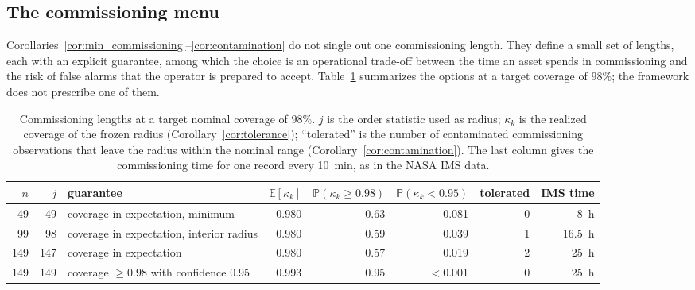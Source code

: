 \documentclass[a4paper]{cas-sc}
\newenvironment{reviewadded}{\par\color{blue}}{\par}
\newcommand{\Prob}{\ensuremath{\mathbb{P}}}
\newcommand{\Expect}{\ensuremath{\mathbb{E}}}
\begin{document}
\begin{reviewadded}
\subsection{The commissioning menu}
\label{subsec:commissioning_menu}

Corollaries~\ref{cor:min_commissioning}--\ref{cor:contamination} do not
single out one commissioning length. They define a small set of lengths, each
with an explicit guarantee, among which the choice is an operational
trade-off between the time an asset spends in commissioning and the risk of
false alarms that the operator is prepared to accept.
Table~\ref{tab:commissioning_menu} summarizes the options at a target coverage
of \(98\%\); the framework does not prescribe one of them.

\begin{table}[htbp]
\color{blue}
\centering
\caption{Commissioning lengths at a target nominal coverage of \(98\%\).
\(j\) is the order statistic used as radius; \(\kappa_k\) is the realized coverage of
the frozen radius (Corollary~\ref{cor:tolerance}); ``tolerated'' is the
number of contaminated commissioning observations that leave the radius
within the nominal range (Corollary~\ref{cor:contamination}). The last column
gives the commissioning time for one record every 10~min, as in the NASA IMS
data.}
\label{tab:commissioning_menu}
\setlength{\tabcolsep}{4pt}\small
\begin{tabular}{rrlrrrrr}
\toprule
\(n\) & \(j\) & guarantee & \(\Expect[\kappa_k]\) & \(\Prob(\kappa_k\ge0.98)\) &
\(\Prob(\kappa_k<0.95)\) & tolerated & IMS time \\
\midrule
49  & 49  & coverage in expectation, minimum        & 0.980 & 0.63 & 0.081   & 0 & 8~h    \\
99  & 98  & coverage in expectation, interior radius & 0.980 & 0.59 & 0.039   & 1 & 16.5~h \\
149 & 147 & coverage in expectation                 & 0.980 & 0.57 & 0.019   & 2 & 25~h   \\
149 & 149 & coverage \(\ge0.98\) with confidence 0.95 & 0.993 & 0.95 & \(<\)0.001 & 0 & 25~h   \\
\bottomrule
\end{tabular}
\end{table}


\end{reviewadded}
\end{document}
